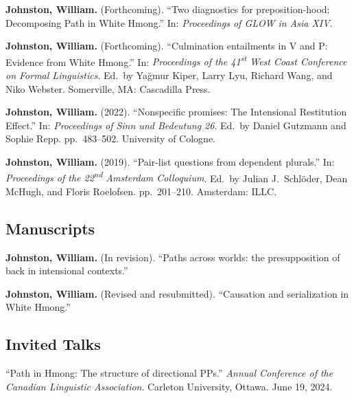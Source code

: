 \documentclass[11pt,oneside,DIV=calc,parskip=off]{scrarticle} %
\newlength{\spacingbefore}
\newlength{\spacingafter}
\newcommand{\myonecol}[1]{%
	\vspace{\spacingbefore}%
	\begin{minipage}[t]{\linewidth}%
		\strut#1%
	\end{minipage}%
	\vspace{\spacingafter}\par%
	}
\newcommand{\pub}[1]{%
	\myonecol{#1}%
	}
\newcommand{\talk}[1]{%
	\myonecol{#1}%
	}
\begin{document}
\pub{\textbf{Johnston, William.} (Forthcoming). ``Two diagnostics for preposition-hood: Decomposing Path in White Hmong.'' In: \textit{Proceedings of GLOW in Asia XIV}. %
}
\pub{\textbf{Johnston, William.} (Forthcoming). ``Culmination entailments in V and P: Evidence from White Hmong.'' In: \textit{Proceedings of the 41\textsuperscript{st} West Coast Conference on Formal Linguistics}. Ed.\ by Yağmur Kiper, Larry Lyu, Richard Wang, and Niko Webster. Somerville, MA: Cascadilla Press.}
\pub{\textbf{Johnston, William.} (2022). ``Nonspecific promises: The Intensional Restitution Effect.'' In: \textit{Proceedings of Sinn und Bedeutung 26}. Ed.\ by Daniel Gutzmann and Sophie Repp. pp.\ 483--502. University of Cologne.}
\pub{\textbf{Johnston, William.} (2019). ``Pair-list questions from dependent plurals.'' In: \textit{Proceedings of the 22\textsuperscript{nd} Amsterdam Colloquium}. Ed.\ by Julian J.\ Schl\"oder, Dean McHugh, and Floris Roelofsen. pp.\ 201--210. Amsterdam: ILLC.}



\subsection{Manuscripts}
\pub{\textbf{Johnston, William.} (In revision). ``Paths across worlds: the presupposition of back in intensional contexts.'' %
} 

\pub{\textbf{Johnston, William.} (Revised and resubmitted). ``Causation and serialization in White Hmong.''} %

\subsection{Invited Talks}
\talk{``Path in Hmong: The structure of directional PPs.'' \textit{Annual Conference of the Canadian Linguistic Association}. Carleton University, Ottawa. June 19, 2024.}
\end{document}
